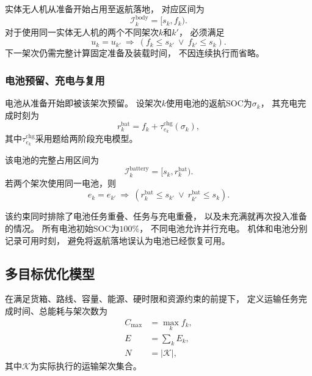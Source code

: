 \documentclass[bwprint]{gmcmthesis}
\begin{document}
实体无人机从准备开始占用至返航落地，
对应区间为
\begin{equation}
    \mathcal{I}_k^{\mathrm{body}}=[s_k,f_k).
\end{equation}
对于使用同一实体无人机的两个不同架次$k$和$k'$，
必须满足
\begin{equation}
    u_k=u_{k'}
    \ \Longrightarrow\
    \left(
    f_k\leq s_{k'}
    \ \lor\
    f_{k'}\leq s_k
    \right).
\end{equation}
下一架次仍需完整计算固定准备及装载时间，
不因连续执行而省略。

\subsubsection{电池预留、充电与复用}

电池从准备开始即被该架次预留。
设架次$k$使用电池的返航SOC为$\sigma_k$，
其充电完成时刻为
\begin{equation}
    r_k^{\mathrm{bat}}
    =
    f_k+
    \tau_{e_k}^{\mathrm{chg}}(\sigma_k),
\end{equation}
其中$\tau_{e_k}^{\mathrm{chg}}$采用题给两阶段充电模型。

该电池的完整占用区间为
\begin{equation}
    \mathcal{I}_k^{\mathrm{battery}}
    =
    [s_k,r_k^{\mathrm{bat}}).
\end{equation}
若两个架次使用同一电池，则
\begin{equation}
    e_k=e_{k'}
    \ \Longrightarrow\
    \left(
    r_k^{\mathrm{bat}}\leq s_{k'}
    \ \lor\
    r_{k'}^{\mathrm{bat}}\leq s_k
    \right).
\end{equation}

该约束同时排除了电池任务重叠、任务与充电重叠，
以及未充满就再次投入准备的情况。
所有电池初始SOC为$100\%$，
不同电池允许并行充电。
机体和电池分别记录可用时刻，
避免将返航落地误认为电池已经恢复可用。

\subsection{多目标优化模型}

在满足货箱、路线、容量、能源、硬时限和资源约束的前提下，
定义运输任务完成时间、总能耗与架次数为
\begin{align}
    C_{\max}&=\max_k f_k,\\
    E&=\sum_k E_k,\\
    N&=|\mathcal{K}|,
\end{align}
其中$\mathcal{K}$为实际执行的运输架次集合。
\end{document}
